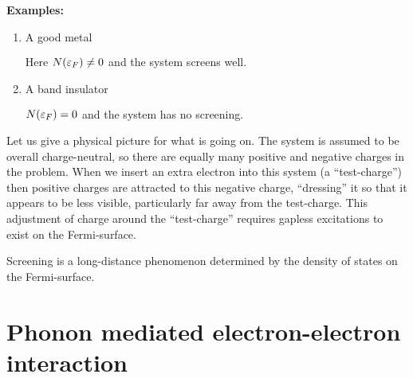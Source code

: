 \textbf{Examples:}

\begin{enumerate}[i]
	\item A good metal
	\begin{align*}
	 \\
		
	\end{align*}
	Here $N(\varepsilon_F) \ne 0$ and the system screens well.
	\item A band insulator 
	\begin{align*}
		 \\
		
	\end{align*}
	$N(\varepsilon_F) = 0$ and the system has no screening.
\end{enumerate}

Let us give a physical picture for what is going on. The system is assumed to be overall charge-neutral, so there are equally many positive and negative charges in the problem. When we insert an extra electron into this system (a ``test-charge'') then positive charges are attracted to this negative charge, ``dressing'' it so that it appears to be less visible, particularly far away from the test-charge. This adjustment of charge around the ``test-charge'' requires gapless excitations to exist on the Fermi-surface. 
\begin{tcolorbox}
	Screening is a long-distance phenomenon determined by the density of states on the Fermi-surface.
\end{tcolorbox}


\clearpage
\section{Phonon mediated electron-electron interaction}

